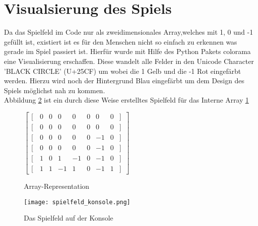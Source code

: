 \section{Visualsierung des Spiels}
\label{sec:visualisierung}
Da das Spielfeld im Code nur als zweidimensionales Array,welches mit 1, 0 und -1 gefüllt ist, existiert ist es für den Menschen nicht so einfach zu erkennen was gerade im Spiel passiert ist. Hierfür wurde mit Hilfe des Python Pakets colorama eine Visualisierung erschaffen. Diese wandelt alle Felder in den Unicode Character 'BLACK CIRCLE' (U+25CF) um wobei die 1 Gelb und die -1 Rot eingefärbt werden. Hierzu wird noch der Hintergrund Blau eingefärbt um dem Design des Spiels möglichst nah zu kommen. \\
Abbildung \ref{fig:spielfeld_konsole} ist ein durch diese Weise erstelltes Spielfeld für das Interne Array \ref{fig:array}\\
\begin{figure}[ht]
\centering
$\begin{bmatrix}                                
[ \, & 0  & 0 & 0 & 0 & 0 & 0 & 0& ]\, \\                                               
[ \, & 0  & 0 & 0 & 0 & 0 & 0 & 0& ]\, \\  
[ \, & 0  & 0 & 0 & 0 & 0 & -1 & 0& ]\, \\  
[ \, & 0  & 0 & 0 & 0 & 0 & -1 & 0& ]\, \\  
[ \, & 1  & 0 & 1 & -1 & 0 & -1 & 0& ]\, \\  
[ \, & 1  & 1 & -1 & 1 & 0 & -1 & 1& ]\,                                               
\end{bmatrix}$
\caption{Array-Representation}
 \label{fig:array}
\end{figure}


\begin{figure}[h!]
  \texttt{[image: spielfeld\_konsole.png]}
  \centering
  \caption{Das Spielfeld auf der Konsole}
  \label{fig:spielfeld_konsole}
\end{figure}
